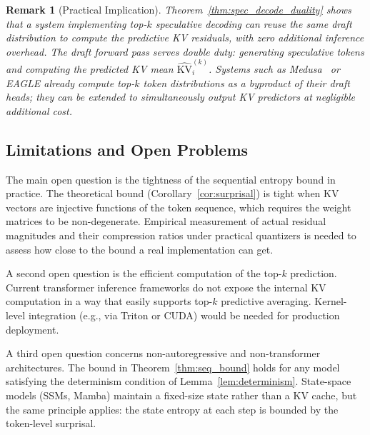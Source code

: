 \documentclass[11pt]{article}
\newtheorem{remark}{Remark}
\begin{document}
\begin{remark}[Practical Implication]
Theorem~\ref{thm:spec_decode_duality} shows that a system implementing top-$k$
speculative decoding can reuse the same draft distribution to compute the
predictive KV residuals, with zero additional inference overhead.  The draft
forward pass serves double duty: generating speculative tokens \emph{and}
computing the predicted KV mean $\widehat{\mathrm{KV}}_i^{(k)}$.  Systems such
as Medusa~\cite{cai2024medusa} or EAGLE already compute top-$k$ token distributions
as a byproduct of their draft heads; they can be extended to simultaneously
output KV predictors at negligible additional cost.
\end{remark}

\subsection{Limitations and Open Problems}

The main open question is the tightness of the sequential entropy bound in
practice.  The theoretical bound (Corollary~\ref{cor:surprisal}) is tight
when KV vectors are injective functions of the token sequence, which requires
the weight matrices to be non-degenerate.  Empirical measurement of actual
residual magnitudes and their compression ratios under practical quantizers
is needed to assess how close to the bound a real implementation can get.

A second open question is the efficient computation of the top-$k$ prediction.
Current transformer inference frameworks do not expose the internal KV computation
in a way that easily supports top-$k$ predictive averaging.  Kernel-level
integration (e.g., via Triton or CUDA) would be needed for production deployment.

A third open question concerns non-autoregressive and non-transformer architectures.
The bound in Theorem~\ref{thm:seq_bound} holds for any model satisfying the
determinism condition of Lemma~\ref{lem:determinism}.  State-space models (SSMs,
Mamba) maintain a fixed-size state rather than a KV cache, but the same principle
applies: the state entropy at each step is bounded by the token-level surprisal.
\end{document}
